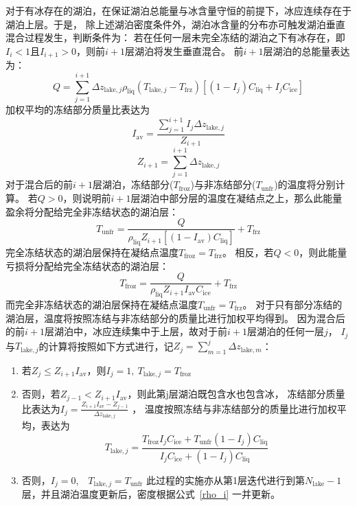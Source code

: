 对于有冰存在的湖泊，在保证湖泊总能量与冰含量守恒的前提下，冰应连续存在于湖泊上层。于是，
除上述湖泊密度条件外，湖泊冰含量的分布亦可触发湖泊垂直混合过程发生，判断条件为：
若在任何一层未完全冻结的湖泊之下有冰存在，即$I_i<1$且$I_{i+1}>0$，则前$i+1$层湖泊将发生垂直混合。
前$i+1$层湖泊的总能量表达为：
\begin{equation}
  Q=\sum_{j=1}^{i+1} \Delta z_{\mathrm{lake},j} \rho_{\mathrm{liq}}\left(T_{\mathrm{lake},j}-T_{\mathrm {frz}}\right)\left[\left(1-I_{j}\right) C_{\mathrm{liq}}+I_{j} C_{\mathrm{ice}}\right]
\end{equation}
加权平均的冻结部分质量比表达为
\begin{equation}
  I_{\mathrm{a v}}=\frac{\sum_{j=1}^{i+1} I_{j} \Delta z_{\mathrm{lake},j}}{Z_{i+1}}
\end{equation}
\begin{equation}
  Z_{i+1}=\sum_{j=1}^{i+1} \Delta z_{\mathrm{lake},j}
\end{equation}
对于混合后的前$i+1$层湖泊，冻结部分($T_{\mathrm{froz}}$)与非冻结部分($T_{\mathrm{unfr}}$)的温度将分别计算。
若$Q>0$，则说明前$i+1$层湖泊中部分层的温度在凝结点之上，那么此能量盈余将分配给完全非冻结状态的湖泊层：
\begin{equation}
  T_{\mathrm{unfr}}=\frac{Q}{\rho_{\mathrm{liq}} Z_{i+1}\left[\left(1-I_{\mathrm{av}}\right) C_{\mathrm{liq}}\right]}+T_{\mathrm {frz}}
\end{equation}
完全冻结状态的湖泊层保持在凝结点温度$T_{\mathrm{froz}}=T_{\mathrm {frz}} $。
相反，若$Q<0$，则此能量亏损将分配给完全冻结状态的湖泊层：
\begin{equation}
  T_{\mathrm{froz}}=\frac{Q}{\rho_{\mathrm{liq}} Z_{i+1} I_{\mathrm{a v}} C_{\mathrm{ice}}}+T_{\mathrm {frz}}
\end{equation}
而完全非冻结状态的湖泊层保持在凝结点温度$T_{\mathrm{unfr}}=T_{\mathrm {frz}} $。
对于只有部分冻结的湖泊层，温度将按照冻结与非冻结部分的质量比进行加权平均得到。
因为混合后的前$i+1$层湖泊中，冰应连续集中于上层，故对于前$i+1$层湖泊的任何一层$j$，
$I_j$与$T_{\mathrm{lake},j}$的计算将按照如下方式进行，记${Z_j}=\sum_{m=1}^{j} \Delta z_{\mathrm{lake},m} $：\\
\begin{enumerate}
  \item 若$Z_j\leqslant Z_{i+1}I_{\mathrm{av}}$，则$I_j=1,\ T_{\mathrm{lake},j}=T_{\mathrm{froz}}$
  \item 否则，若$Z_{j-1}<Z_{i+1} I_{\mathrm{a v}}$，则此第j层湖泊既包含水也包含冰，
    冻结部分质量比表达为$I_{j}=\frac{Z_{i+1} I_{\mathrm{a v}}-Z_{j-1}}{\Delta z_{\mathrm{lake},j}}$ ，
    温度按照冻结与非冻结部分的质量比进行加权平均，表达为
    \begin{equation}
      T_{\mathrm{lake},j}=\frac{T_{\mathrm{f r o z}} I_{j} C_{\mathrm{ice}}+T_{\mathrm{u n f r}}\left(1-I_{j}\right) C_{\mathrm{liq}}}{I_{j} C_{\mathrm{ice}}+\left(1-I_{j}\right) C_{\mathrm{liq}}}
    \end{equation}
  \item 否则，$I_j=0$,\ \ $T_{\mathrm{lake},j}=T_{\mathrm{unfr}}$
    此过程的实施亦从第1层迭代进行到第$N_{\mathrm{lake}}-1$层，并且湖泊温度更新后，密度根据公式~\eqref{rho_i} 一并更新。
\end{enumerate}


